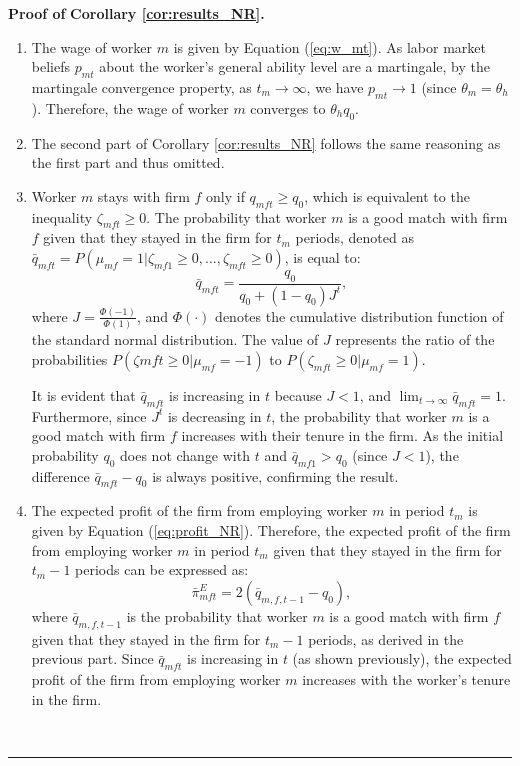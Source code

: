 \documentclass[12pt]{article}
\newenvironment{proof}[1][Proof of]{\noindent\textbf{#1} }{\ \rule{0.5em}{0.5em}}
\begin{document}
\begin{proof}
    \textbf{Corollary \ref{cor:results_NR}.}
    \begin{enumerate}[label={\roman*})]
        \item The wage of worker $m$ is given by Equation (\ref{eq:w_mt}). As labor market beliefs $p_{mt}$ about the worker's general ability level are a martingale, by the martingale convergence property, as $t_m \rightarrow \infty$, we have $p_{mt} \rightarrow 1$ (since $\theta_m = \theta_h$). Therefore, the wage of worker $m$ converges to $\theta_h q_0$.
        \item The second part of Corollary \ref{cor:results_NR} follows the same reasoning as the first part and thus omitted.
        \item Worker $m$ stays with firm $f$ only if $q_{mft} \geq q_0$, which is equivalent to the inequality $\zeta_{mft} \geq 0$. The probability that worker $m$ is a good match with firm $f$ given that they stayed in the firm for $t_m$ periods, denoted as $\bar{q}_{mft} = P(\mu_{mf} =1 | \zeta_{mf1} \geq 0, ... , \zeta_{mft} \geq 0)$, is equal to:
            \begin{equation*}
                \bar{q}_{mft} = \frac{q_0}{q_0 + (1-q_0)J^t},
            \end{equation*}
        where $J = \frac{\Phi(-1)}{\Phi(1)}$, and $\Phi(\cdot)$ denotes the cumulative distribution function of the standard normal distribution. The value of $J$ represents the ratio of the probabilities $P(\zeta{mft}\geq 0 | \mu_{mf} = -1)$ to $P(\zeta_{mft}\geq 0 | \mu_{mf} = 1)$.

        It is evident that $\bar{q}_{mft}$ is increasing in $t$ because $J < 1$, and $\lim_{t \rightarrow \infty}\bar{q}_{mft} = 1$. Furthermore, since $J^t$ is decreasing in $t$, the probability that worker $m$ is a good match with firm $f$ increases with their tenure in the firm. As the initial probability $q_0$ does not change with $t$ and $\bar{q}_{mf1} > q_0$ (since $J < 1$), the difference $\bar{q}_{mft} - q_0$ is always positive, confirming the result.
        \item The expected profit of the firm from employing worker $m$ in period $t_m$ is given by Equation (\ref{eq:profit_NR}). Therefore, the expected profit of the firm from employing worker $m$ in period $t_m$ given that they stayed in the firm for $t_m-1$ periods can be expressed as:
        \begin{equation*}
            \bar{\pi}^E_{mft} = 2(\bar{q}_{m,f,t-1} - q_0),
        \end{equation*}
        where $\bar{q}_{m,f,t-1}$ is the probability that worker $m$ is a good match with firm $f$ given that they stayed in the firm for $t_m-1$ periods, as derived in the previous part. Since $\bar{q}_{mft}$ is increasing in $t$ (as shown previously), the expected profit of the firm from employing worker $m$ increases with the worker's tenure in the firm.
    \end{enumerate}
\end{proof}
\end{document}
